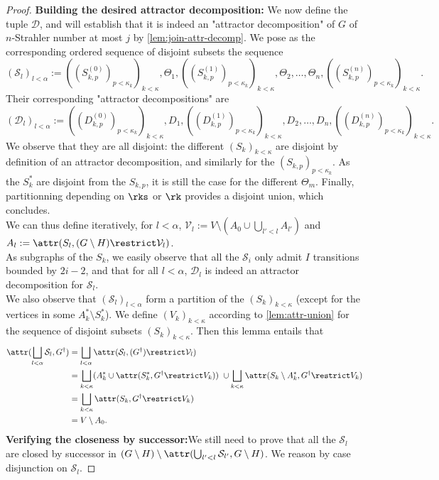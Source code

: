\documentclass[a4paper,UKenglish,cleveref, autoref, thm-restate]{lipics-v2021}
\newcommand{\A}{{A}}
\newcommand{\D}{\mathcal{D}}
\renewcommand{\S}{\mathcal{S}}
\newcommand{\V}{\mathcal{V}}
\begin{document}
\begin{proof}
	\textbf{Building the desired attractor decomposition:} We now define the tuple $\D$, and will establish that it is indeed an "attractor decomposition" of $G$ of $n$-Strahler number at most $j$ by \cref{lem:join-attr-decomp}. We pose as the corresponding ordered sequence of disjoint subsets the sequence $$(\S_l)_{l<\alpha} := ((S^{(0)}_{k,p})_{p<\kappa_k})_{k<\kappa}, \Theta_1, ((S^{(1)}_{k,p})_{p<\kappa_k})_{k<\kappa}, \Theta_2, \dots, \Theta_n, ((S^{(n)}_{k,p})_{p<\kappa_k})_{k<\kappa}.$$ Their corresponding "attractor decompositions" are $$ (\D_l)_{l<\alpha} := ((D^{(0)}_{k,p})_{p<\kappa_k})_{k<\kappa}, D_1, ((D^{(1)}_{k,p})_{p<\kappa_k})_{k<\kappa}, D_2, \dots, D_n, ((D^{(n)}_{k,p})_{p<\kappa_k})_{k<\kappa}.$$
	We observe that they are all disjoint: the different $(S_k)_{k<\kappa}$ are disjoint by definition of an attractor decomposition, and similarly for the $(S_{k,p})_{p<\kappa_k}$. As the $S^*_k$ are disjoint from the $S_{k,p}$, it is still the case for the different $\Theta_m$. Finally, partitionning depending on $\rks$ or $\rk$ provides a disjoint union, which concludes.\\
	We can thus define iteratively, for $l < \alpha$, $\V_l:=V\setminus (A_0 \cup \bigcup_{l'< l}\A_{l'})$ and $\A_l := \attr(S_l,(G\setminus H)\restrict \V_l)$.\\
	As subgraphs of the $S_k$, we easily observe that all the $\S_i$ only admit $I$ transitions bounded by $2i-2$, and that for all $l<\alpha$, $\D_l$ is indeed an attractor decomposition for $\S_l$.\\
	We also observe that $(\S_l)_{l<\alpha}$ form a partition of the $(S_k)_{k<\kappa}$ (except for the vertices in some $A^*_k \setminus S^*_k$).
	We define $(V_k)_{k< \kappa}$ according to \cref{lem:attr-union} for the sequence of disjoint subsets $(S_k)_{k<\kappa}$. Then this lemma entails that 
	\begin{align*}
		\attr(\bigsqcup_{l<\alpha}\S_l, G^\dagger) &= \bigsqcup_{l<\alpha} \attr(\S_l,(G^\dagger)\restrict \V_l)\\
		&= \bigsqcup_{k<\kappa}(A^*_k\cup \attr(S^*_k, G^\dagger \restrict V_k)) \ \cup \bigsqcup_{k<\kappa}\attr(S_k\setminus A^*_k, G^\dagger \restrict V_k)\\
		&= \bigsqcup_{k<\kappa} \attr(S_k, G^\dagger \restrict V_k)\\
		&= V\setminus A_0.
	\end{align*}
	\textbf{Verifying the closeness by successor:}We still need to prove that all the $\S_l$ are closed by successor in $(G\setminus H)\setminus \attr(\bigcup_{l'<l} \S_{l'}, G\setminus H)$. We reason by case disjunction on $\S_l$.

\end{proof}
\end{document}

